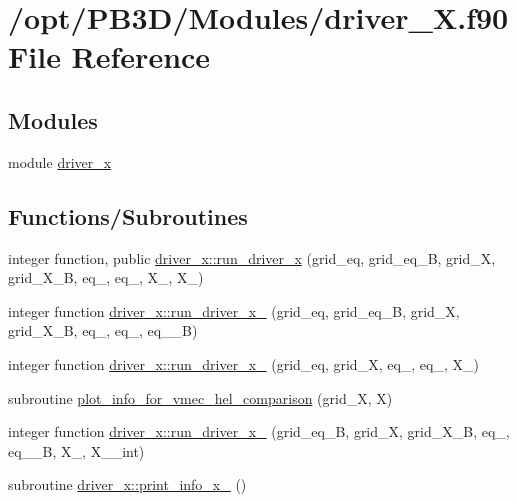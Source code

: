 \hypertarget{driver__X_8f90}{}\section{/opt/\+P\+B3\+D/\+Modules/driver\+\_\+X.f90 File Reference}
\label{driver__X_8f90}
\subsection*{Modules}
\begin{DoxyCompactItemize}
\item 
module \hyperlink{namespacedriver__x}{driver\+\_\+x}
\end{DoxyCompactItemize}
\subsection*{Functions/\+Subroutines}
\begin{DoxyCompactItemize}
\item 
integer function, public \hyperlink{namespacedriver__x_ada3d72a0929daaa5e3da585246d62281}{driver\+\_\+x\+::run\+\_\+driver\+\_\+x} (grid\+\_\+eq, grid\+\_\+eq\+\_\+B, grid\+\_\+X, grid\+\_\+\+X\+\_\+B, eq\+\_, eq\+\_, X\+\_, X\+\_)
\item 
integer function \hyperlink{namespacedriver__x_a2b82a9bc6c0f4af9f3468d03fedc008e}{driver\+\_\+x\+::run\+\_\+driver\+\_\+x\+\_} (grid\+\_\+eq, grid\+\_\+eq\+\_\+B, grid\+\_\+X, grid\+\_\+\+X\+\_\+B, eq\+\_, eq\+\_, eq\+\_\+\_\+B)
\item 
integer function \hyperlink{namespacedriver__x_a454779cefa6da3714d32eedcec0ef7de}{driver\+\_\+x\+::run\+\_\+driver\+\_\+x\+\_} (grid\+\_\+eq, grid\+\_\+X, eq\+\_, eq\+\_, X\+\_)
\item 
subroutine \hyperlink{driver__X_8f90_ae1cbf887791dfb7f7ccf42abb9a8aed6}{plot\+\_\+info\+\_\+for\+\_\+vmec\+\_\+hel\+\_\+comparison} (grid\+\_\+X, X)
\item 
integer function \hyperlink{namespacedriver__x_ad3924b3d66f336f0a9a9559eafffec8e}{driver\+\_\+x\+::run\+\_\+driver\+\_\+x\+\_} (grid\+\_\+eq\+\_\+B, grid\+\_\+X, grid\+\_\+\+X\+\_\+B, eq\+\_, eq\+\_\+\_\+B, X\+\_, X\+\_\+\_\+int)
\item 
subroutine \hyperlink{namespacedriver__x_aca49d362e21df044e21d5ba4b2599cf4}{driver\+\_\+x\+::print\+\_\+info\+\_\+x\+\_} ()
\end{DoxyCompactItemize}


